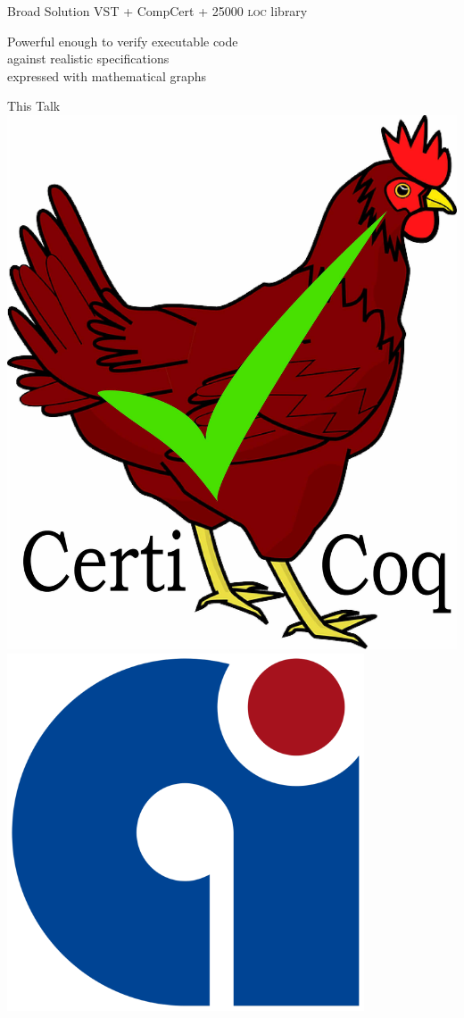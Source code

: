 \documentclass[usenames, xcolor=dvipsnames]{beamer}
\begin{document}
\begin{frame}{Broad Solution}
\bigskip
VST + CompCert + 25000 \textsc{loc} library

\pause
\bigskip
Powerful enough to verify \alert{executable code}
\\\hspace{1em}against \alert{realistic specifications}
\\\hspace{2em}expressed with \alert{mathematical graphs}

\pause 
\bigskip
{}
\end{frame}

\begin{frame}{This Talk}
\includegraphics[scale=0.02]{certicoq_logo} 
\hspace{2em} \includegraphics[scale=0.12]{compcert_logo}


\end{frame}
\end{document}
